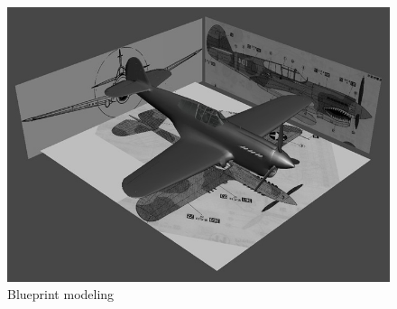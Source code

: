 \begin{figure}[h]
	\centering
	\includegraphics[width=\textwidth]{"figures/Blueprint modeling"}
	\caption{Blueprint modeling}\label{fig: Blueprint modeling}
\end{figure}

